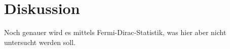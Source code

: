 \section{Diskussion}
\label{sec:Diskussion}

Noch genauer wird es mittels Fermi-Dirac-Statistik, was hier aber nicht untersucht werden soll.